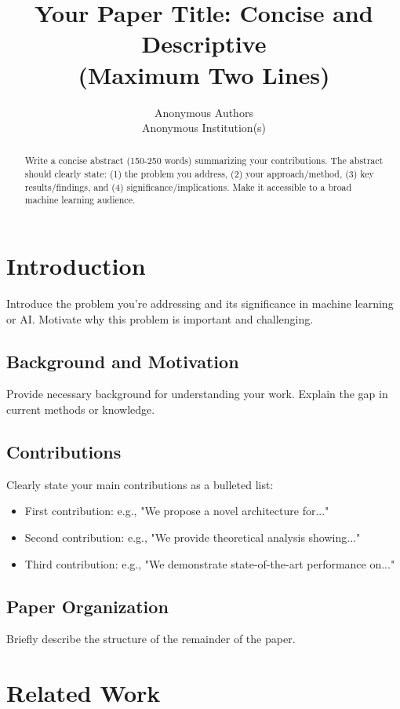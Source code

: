 \documentclass{article}
\title{Your Paper Title: Concise and Descriptive \\ (Maximum Two Lines)}
\author{
  Anonymous Authors \\
  Anonymous Institution(s) \\
}
\begin{document}
\maketitle

\begin{abstract}
Write a concise abstract (150-250 words) summarizing your contributions. The abstract should clearly state: (1) the problem you address, (2) your approach/method, (3) key results/findings, and (4) significance/implications. Make it accessible to a broad machine learning audience.
\end{abstract}

\section{Introduction}
\label{sec:introduction}

Introduce the problem you're addressing and its significance in machine learning or AI. Motivate why this problem is important and challenging.

\subsection{Background and Motivation}
Provide necessary background for understanding your work. Explain the gap in current methods or knowledge.

\subsection{Contributions}
Clearly state your main contributions as a bulleted list:
\begin{itemize}
    \item First contribution: e.g., "We propose a novel architecture for..."
    \item Second contribution: e.g., "We provide theoretical analysis showing..."
    \item Third contribution: e.g., "We demonstrate state-of-the-art performance on..."
\end{itemize}

\subsection{Paper Organization}
Briefly describe the structure of the remainder of the paper.

\section{Related Work}
\label{sec:related}
\end{document}
